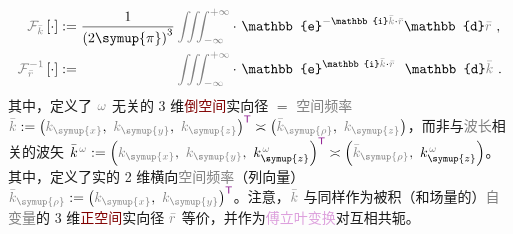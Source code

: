 \begin{subequations} \label{eq:FT-rk}
	\abovedisplayskip=10pt
	\belowdisplayskip=12pt
\begin{align}
	\mathcolor{gray}{\mathcal F_{\bar{k}}} \left[ \cdot \right] &:= \frac{ 1 }{ \left( 2\symup{\pi} \right)^3 } \mathcolor{gray}{\iiint_{-\infty}^{+\infty}} \cdot~ \mathbb{e}^{-\mathbb{i}\mathcolor{gray}{\bar{k}} \cdot \mathcolor{gray}{\bar{r}}} \mathbb{d}\mathcolor{gray}{\bar{r}} ~, \label{eq:FT-k} \\
	\mathcolor{gray}{\mathcal F_{\bar{r}}^{-1}} \left[ \cdot \right] &:= \hphantom{\frac{ 1 }{ \left( 2\symup{\pi} \right)^3 }} \mathcolor{gray}{\iiint_{-\infty}^{+\infty}} \cdot~ \mathbb{e}^{\mathbb{i}\mathcolor{gray}{\bar{k}} \cdot \mathcolor{gray}{\bar{r}}} \hphantom{^-} \mathbb{d}\mathcolor{gray}{\bar{k}} ~. \label{eq:IFT-r}
\end{align}
\end{subequations}
其中，定义了 $\mathcolor{gray}{\omega}$ 无关的 3 维\textcolor{Maroon}{倒空间}实向径 $=$ \textcolor{gray}{空间频率} $\mathcolor{gray}{\bar{k}} := \left( \mathcolor{gray}{k_{\symup{x}}},~ \mathcolor{gray}{k_{\symup{y}}},~ \mathcolor{gray}{k_{\symup{z}}} \right)^{\mathsf{\textcolor{Plum}{T}}} \asymp \left( \mathcolor{gray}{\bar{k}_{\symup{\rho}}},~ \mathcolor{gray}{k_{\symup{z}}} \right)$，而非与\textcolor{gray}{波长}相关的\textcolor{PineGreen}{波矢} $\bar{k}^{\;\! \mathcolor{gray}{\omega}} := \left( \mathcolor{gray}{k_{\symup{x}}},~ \mathcolor{gray}{k_{\symup{y}}},~ k_{\symup{z}}^{\;\! \mathcolor{gray}{\omega}} \right)^{\mathsf{\textcolor{Plum}{T}}} \asymp \left( \mathcolor{gray}{\bar{k}_{\symup{\rho}}},~ k_{\symup{z}}^{\;\! \mathcolor{gray}{\omega}} \right)$。其中，定义了实的 2 维横向\textcolor{gray}{空间频率}（列向量） $\mathcolor{gray}{\bar{k}_{\symup{\rho}}} := \left( \mathcolor{gray}{k_{\symup{x}}},~ \mathcolor{gray}{k_{\symup{y}}} \right)^{\mathsf{\textcolor{Plum}{T}}}$。注意，$\mathcolor{gray}{\bar{k}}$ 与同样作为被积（和场量的）\textcolor{gray}{自变量}的 3 维\textcolor{Maroon}{正空间}实向径 $\mathcolor{gray}{\bar{r}}$ 等价，并作为\textcolor{Plum}{傅立叶变换}对互相共轭。

